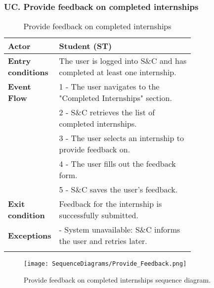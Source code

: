 \subsubsection*{UC\cuc . Provide feedback on completed internships}
\begin{center}
    \begin{longtable}{|l|p{0.75\linewidth}|}
        \hline
        \textbf{Actor}            & Student (ST) \\
        \hline
        \textbf{Entry conditions} & The user is logged into S\&C and has completed at least one internship. \\
        \hline
        \textbf{Event Flow}       & 1 - The user navigates to the "Completed Internships" section. \\
        & 2 - S\&C retrieves the list of completed internships. \\
        & 3 - The user selects an internship to provide feedback on. \\
        & 4 - The user fills out the feedback form. \\
        & 5 - S\&C saves the user's feedback. \\
        \hline
        \textbf{Exit condition}   & Feedback for the internship is successfully submitted. \\       
        \hline
        \textbf{Exceptions}       & - System unavailable: S\&C informs the user and retries later. \\
        \hline
        \caption{Provide feedback on completed internships}
        \label{tab:provide_feedback_usecase}
    \end{longtable}
\end{center}

\begin{figure}[H]
    \begin{center}
        \texttt{[image: SequenceDiagrams/Provide\_Feedback.png]}
        \caption{Provide feedback on completed internships sequence diagram.}
        \label{fig:provide_feedback_seqd}%
    \end{center}
\end{figure}


